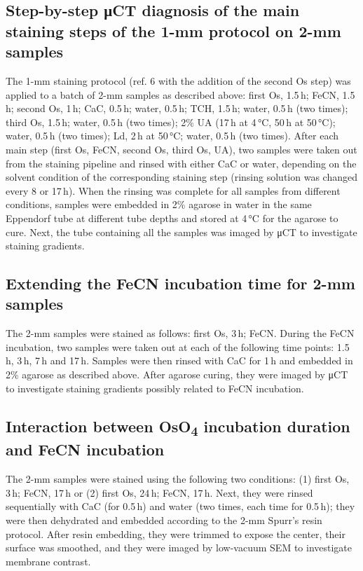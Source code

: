 \documentclass{article}
\begin{document}
\subsection*{Step-by-step μCT diagnosis of the main staining steps of the 1-mm protocol on 2-mm samples}
The 1-mm staining protocol (ref. 6 with the addition of the second Os step) was applied to a batch of 2-mm samples as described above: first Os, 1.5\,h; FeCN, 1.5\,h; second Os, 1\,h; CaC, 0.5\,h; water, 0.5\,h; TCH, 1.5\,h; water, 0.5\,h (two times); third Os, 1.5\,h; water, 0.5\,h (two times); 2\% UA (17\,h at 4\,°C, 50\,h at 50\,°C); water, 0.5\,h (two times); Ld, 2\,h at 50\,°C; water, 0.5\,h (two times). After each main step (first Os, FeCN, second Os, third Os, UA), two samples were taken out from the staining pipeline and rinsed with either CaC or water, depending on the solvent condition of the corresponding staining step (rinsing solution was changed every 8 or 17\,h). When the rinsing was complete for all samples from different conditions, samples were embedded in 2\% agarose in water in the same Eppendorf tube at different tube depths and stored at 4\,°C for the agarose to cure. Next, the tube containing all the samples was imaged by μCT to investigate staining gradients.

\subsection*{Extending the FeCN incubation time for 2-mm samples}
The 2-mm samples were stained as follows: first Os, 3\,h; FeCN. During the FeCN incubation, two samples were taken out at each of the following time points: 1.5\,h, 3\,h, 7\,h and 17\,h. Samples were then rinsed with CaC for 1\,h and embedded in 2\% agarose as described above. After agarose curing, they were imaged by μCT to investigate staining gradients possibly related to FeCN incubation.

\subsection*{Interaction between OsO\textsubscript{4} incubation duration and FeCN incubation}
The 2-mm samples were stained using the following two conditions: (1) first Os, 3\,h; FeCN, 17\,h or (2) first Os, 24\,h; FeCN, 17\,h. Next, they were rinsed sequentially with CaC (for 0.5\,h) and water (two times, each time for 0.5\,h); they were then dehydrated and embedded according to the 2-mm Spurr’s resin protocol. After resin embedding, they were trimmed to expose the center, their surface was smoothed, and they were imaged by low-vacuum SEM to investigate membrane contrast.
\end{document}
